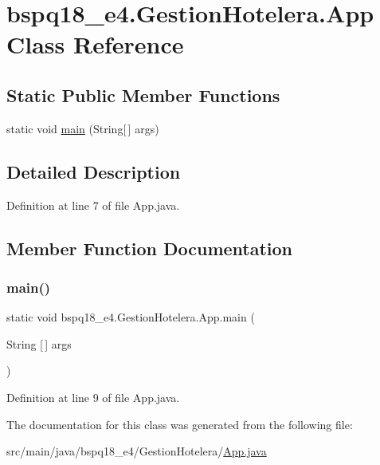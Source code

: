 \hypertarget{classbspq18__e4_1_1_gestion_hotelera_1_1_app}{}\section{bspq18\+\_\+e4.\+Gestion\+Hotelera.\+App Class Reference}
\label{classbspq18__e4_1_1_gestion_hotelera_1_1_app}
\subsection*{Static Public Member Functions}
\begin{DoxyCompactItemize}
\item 
static void \mbox{\hyperlink{classbspq18__e4_1_1_gestion_hotelera_1_1_app_a8b168a80544270111239373122dbfb3e}{main}} (String\mbox{[}$\,$\mbox{]} args)
\end{DoxyCompactItemize}


\subsection{Detailed Description}


Definition at line 7 of file App.\+java.



\subsection{Member Function Documentation}
\mbox{\label{classbspq18__e4_1_1_gestion_hotelera_1_1_app_a8b168a80544270111239373122dbfb3e}} 
\subsubsection{\texorpdfstring{main()}{main()}}
{\footnotesize\ttfamily static void bspq18\+\_\+e4.\+Gestion\+Hotelera.\+App.\+main (\begin{DoxyParamCaption}\item[{String \mbox{[}$\,$\mbox{]}}]{args }\end{DoxyParamCaption})\hspace{0.3cm}{\ttfamily [static]}}



Definition at line 9 of file App.\+java.



The documentation for this class was generated from the following file\+:\begin{DoxyCompactItemize}
\item 
src/main/java/bspq18\+\_\+e4/\+Gestion\+Hotelera/\mbox{\hyperlink{_app_8java}{App.\+java}}\end{DoxyCompactItemize}
